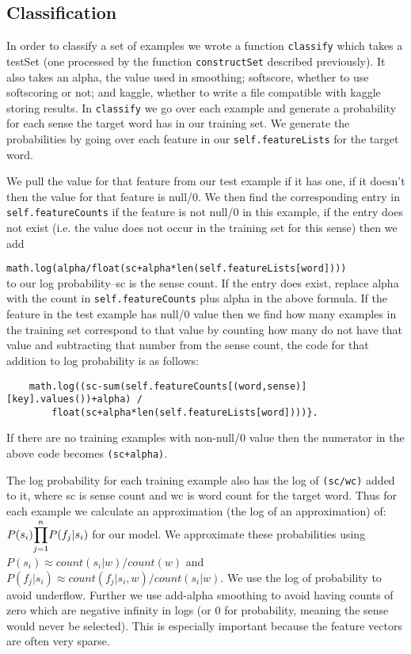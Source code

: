 \documentclass{article}
\begin{document}
\subsection{Classification}

In order to classify a set of examples we wrote a function \texttt{classify} which takes a testSet (one processed by the function \texttt{constructSet} described previously). It also takes an alpha, the value used in smoothing; softscore, whether to use softscoring or not; and kaggle, whether to write a file compatible with kaggle storing results. In \texttt{classify} we go over each example and generate a probability for each sense the target word has in our training set. We generate the probabilities by going over each feature in our \texttt{self.featureLists} for the target word.

We pull the value for that feature from our test example if it has one, if it doesn't then the value for that feature is null/0. We then find the corresponding entry in \texttt{self.featureCounts} if the feature is not null/0 in this example, if the entry does not exist (i.e. the value does not occur in the training set for this sense) then we add\par
\texttt{math.log(alpha/float(sc+alpha*len(self.featureLists[word])))}\\
to our log probability--sc is the sense count. If the entry does exist, replace alpha with the count in \texttt{self.featureCounts} plus alpha in the above formula. If the feature in the test example has null/0 value then we find how many examples in the training set correspond to that value by counting how many do not have that value and subtracting that number from the sense count, the code for that addition to log probability is as follows:\par
\begin{verbatim}
    math.log((sc-sum(self.featureCounts[(word,sense)][key].values())+alpha) /
        float(sc+alpha*len(self.featureLists[word])))}.
\end{verbatim}
If there are no training examples with non-null/0 value then the numerator in the above code becomes \texttt{(sc+alpha)}.

The log probability for each training example also has the log of \texttt{(sc/wc)} added to it, where sc is sense count and wc is word count for the target word. Thus for each example we calculate an approximation (the log of an approximation) of:
$P(s_i)\mathlarger{\prod}_{j=1}^{n}P(f_j|s_i)$ for our model. We approximate these probabilities using $P(s_i) \approx count(s_i|w)/count(w)$ and $P(f_j|s_i) \approx count(f_j|s_i,w)/count(s_i|w)$. We use the log of probability to avoid underflow. Further we use add-alpha smoothing to avoid having counts of zero which are negative infinity in logs (or 0 for probability, meaning the sense would never be selected). This is especially important because the feature vectors are often very sparse.
\end{document}
